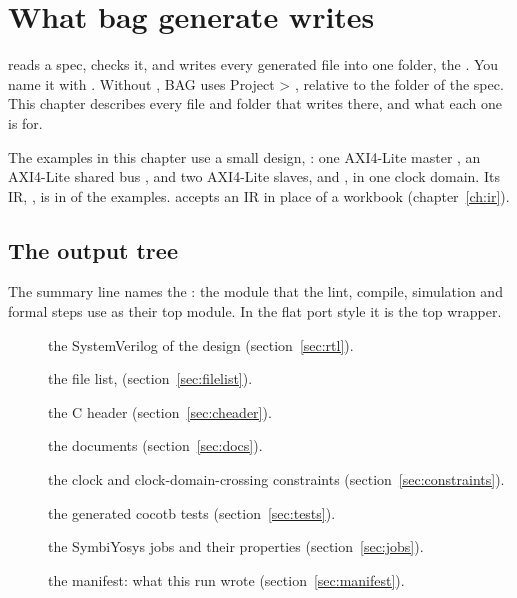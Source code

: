\chapter{What bag generate writes}
\label{ch:outputs}

 reads a spec, checks it, and writes every generated file into one
folder, the . You name it with . Without , BAG
uses Project > , relative to the folder of the spec. This
chapter describes every file and folder that  writes there, and what
each one is for.

The examples in this chapter use a small design, : one AXI4-Lite master
, an AXI4-Lite shared bus , and two AXI4-Lite slaves,  and
, in one clock domain. Its IR, , is in  of
the examples.  accepts an IR in place of a workbook (chapter~\ref{ch:ir}).

\section{The output tree}
\label{sec:tree}



The summary line names the : the module that the lint, compile, simulation and
formal steps use as their top module. In the flat port style it is the top wrapper.

\begin{description}
\item[] the SystemVerilog of the design (section~\ref{sec:rtl}).
\item[] the file list,  (section~\ref{sec:filelist}).
\item[] the C header (section~\ref{sec:cheader}).
\item[] the documents (section~\ref{sec:docs}).
\item[] the clock and clock-domain-crossing constraints
  (section~\ref{sec:constraints}).
\item[] the generated cocotb tests (section~\ref{sec:tests}).
\item[] the SymbiYosys jobs and their properties (section~\ref{sec:jobs}).
\item[] the manifest: what this run wrote
  (section~\ref{sec:manifest}).
\end{description}


